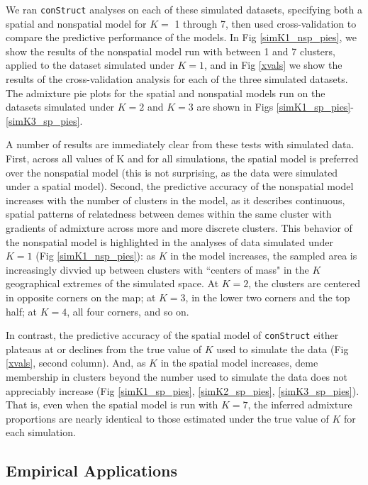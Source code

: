 \documentclass[12pt]{article}
\begin{document}
We ran \texttt{conStruct} analyses on each of these simulated datasets, 
specifying both a spatial and nonspatial model for $K = $ 1 through 7, 
then used cross-validation to compare the predictive performance of the models.
In Fig \ref{simK1_nsp_pies}, we show the results of the nonspatial model 
run with between 1 and 7 clusters, applied to the dataset simulated under $K=1$,
and in Fig \ref{xvals} we show the results of the cross-validation analysis for each of the three simulated datasets.
The admixture pie plots for the spatial and nonspatial models run on the datasets simulated under $K=2$ and $K=3$
are shown in Figs \ref{simK1_sp_pies}-\ref{simK3_sp_pies}.

A number of results are immediately clear from these tests with simulated data.
First, across all values of K and for all simulations, 
the spatial model is preferred over the nonspatial model
(this is not surprising, as the data were simulated under a spatial model).
Second, the predictive accuracy of the nonspatial model increases with the number of clusters in the model, 
as it describes continuous, spatial patterns of relatedness between demes within the same cluster 
with gradients of admixture across more and more discrete clusters.
This behavior of the nonspatial model is highlighted in the analyses of data simulated under $K=1$ (Fig \ref{simK1_nsp_pies}):
as $K$ in the model increases, 
the sampled area is increasingly divvied up between clusters 
with ``centers of mass" in the $K$ geographical extremes of the simulated space.
At $K=2$, the clusters are centered in opposite corners on the map; 
at $K=3$, in the lower two corners and the top half; 
at $K=4$, all four corners, and so on.

In contrast, the predictive accuracy of the spatial model of \texttt{conStruct} 
either plateaus at or declines from the true value of $K$ used to simulate the data (Fig \ref{xvals}, second column).
And, as $K$ in the spatial model increases, 
deme membership in clusters beyond the number used to simulate the data does not appreciably increase 
(Fig \ref{simK1_sp_pies}, \ref{simK2_sp_pies}, \ref{simK3_sp_pies}).
That is, even when the spatial model is run with $K=7$, 
the inferred admixture proportions are nearly identical to 
those estimated under the true value of $K$ for each simulation.

\subsection*{Empirical Applications}
\end{document}
